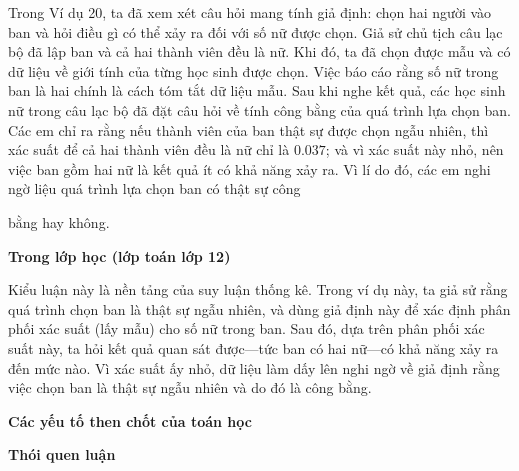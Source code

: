   {
    Trong Ví dụ 20, ta đã xem xét câu hỏi mang tính giả định: chọn hai người vào ban và hỏi điều gì có thể xảy ra đối với số nữ được chọn. Giả sử chủ tịch câu lạc bộ đã lập ban và cả hai thành viên đều là nữ. Khi đó, ta đã chọn được mẫu và có dữ liệu về giới tính của từng học sinh được chọn. Việc báo cáo rằng số nữ trong ban là hai chính là cách tóm tắt dữ liệu mẫu. Sau khi nghe kết quả, các học sinh nữ trong câu lạc bộ đã đặt câu hỏi về tính công bằng của quá trình lựa chọn ban. Các em chỉ ra rằng nếu thành viên của ban thật sự được chọn ngẫu nhiên, thì xác suất để cả hai thành viên đều là nữ chỉ là $0.037$; và vì xác suất này nhỏ, nên việc ban gồm hai nữ là kết quả ít có khả năng xảy ra. Vì lí do đó, các em nghi ngờ liệu quá trình lựa chọn ban có thật sự công\par\vspace{\baselineskip} bằng hay không.

    \textbf{Trong lớp học (lớp toán lớp 12)}\vspace{\baselineskip}

    Kiểu luận này là nền tảng của suy luận thống kê. Trong ví dụ này, ta giả sử rằng quá trình chọn ban là thật sự ngẫu nhiên, và dùng giả định này để xác định phân phối xác suất (lấy mẫu) cho số nữ trong ban. Sau đó, dựa trên phân phối xác suất này, ta hỏi kết quả quan sát được---tức ban có hai nữ---có khả năng xảy ra đến mức nào. Vì xác suất ấy nhỏ, dữ liệu làm dấy lên nghi ngờ về giả định rằng việc chọn ban là thật sự ngẫu nhiên và do đó là công bằng.

    \textbf{Các yếu tố then chốt của toán học}

    \begin{hanglist}
    \end{hanglist}

    \textbf{Thói quen luận}

    \begin{hanglist}

    \end{hanglist}
  }
